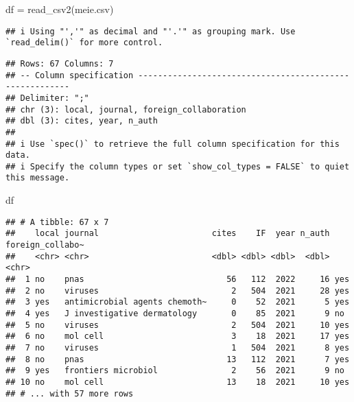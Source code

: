 \documentclass[
]{article}
\newenvironment{Shaded}{\begin{snugshade}}{\end{snugshade}}
\newcommand{\FunctionTok}[1]{\textcolor[rgb]{0.00,0.00,0.00}{#1}}
\newcommand{\NormalTok}[1]{#1}
\newcommand{\OtherTok}[1]{\textcolor[rgb]{0.56,0.35,0.01}{#1}}
\newcommand{\StringTok}[1]{\textcolor[rgb]{0.31,0.60,0.02}{#1}}
\begin{document}
\begin{Shaded}
\begin{Highlighting}[]
\NormalTok{df }\OtherTok{=} \FunctionTok{read\_csv2}\NormalTok{(}\StringTok{\textquotesingle{}meie.csv\textquotesingle{}}\NormalTok{)}
\end{Highlighting}
\end{Shaded}

\begin{verbatim}
## i Using "','" as decimal and "'.'" as grouping mark. Use `read_delim()` for more control.
\end{verbatim}

\begin{verbatim}
## Rows: 67 Columns: 7
## -- Column specification --------------------------------------------------------
## Delimiter: ";"
## chr (3): local, journal, foreign_collaboration
## dbl (3): cites, year, n_auth
## 
## i Use `spec()` to retrieve the full column specification for this data.
## i Specify the column types or set `show_col_types = FALSE` to quiet this message.
\end{verbatim}

\begin{Shaded}
\begin{Highlighting}[]
\NormalTok{df}
\end{Highlighting}
\end{Shaded}

\begin{verbatim}
## # A tibble: 67 x 7
##    local journal                       cites    IF  year n_auth foreign_collabo~
##    <chr> <chr>                         <dbl> <dbl> <dbl>  <dbl> <chr>           
##  1 no    pnas                             56   112  2022     16 yes             
##  2 no    viruses                           2   504  2021     28 yes             
##  3 yes   antimicrobial agents chemoth~     0    52  2021      5 yes             
##  4 yes   J investigative dermatology       0    85  2021      9 no              
##  5 no    viruses                           2   504  2021     10 yes             
##  6 no    mol cell                          3    18  2021     17 yes             
##  7 no    viruses                           1   504  2021      8 yes             
##  8 no    pnas                             13   112  2021      7 yes             
##  9 yes   frontiers microbiol               2    56  2021      9 no              
## 10 no    mol cell                         13    18  2021     10 yes             
## # ... with 57 more rows
\end{verbatim}
\end{document}
